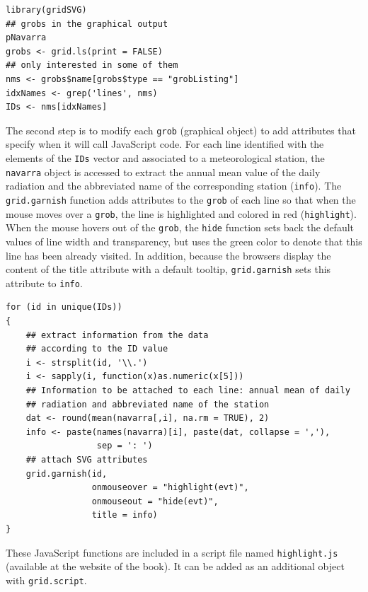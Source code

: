 \documentclass[smallroyalvopaper]{memoir}
\begin{document}
\lstset{language=r,label= ,caption= ,captionpos=b,numbers=none}
\begin{lstlisting}
library(gridSVG)
## grobs in the graphical output
pNavarra
grobs <- grid.ls(print = FALSE)
## only interested in some of them
nms <- grobs$name[grobs$type == "grobListing"]
idxNames <- grep('lines', nms)
IDs <- nms[idxNames]
\end{lstlisting}

The second step is to modify each \texttt{grob} (graphical object) to add
attributes that specify when it will call JavaScript code. For each
line identified with the elements of the \texttt{IDs} vector and associated
to a meteorological station, the \texttt{navarra} object is accessed to
extract the annual mean value of the daily radiation and the
abbreviated name of the corresponding station (\texttt{info}).  The
\texttt{grid.garnish} function adds attributes to the \texttt{grob} of each line so
that when the mouse moves over a \texttt{grob}, the line is highlighted and
colored in red (\texttt{highlight}). When the mouse hovers out of the \texttt{grob},
the \texttt{hide} function sets back the default values of line width and
transparency, but uses the green color to denote that this line has
been already visited. In addition, because the browsers display the
content of the title attribute with a default tooltip, \texttt{grid.garnish}
sets this attribute to \texttt{info}.


\lstset{language=r,label= ,caption= ,captionpos=b,numbers=none}
\begin{lstlisting}
for (id in unique(IDs))
{
    ## extract information from the data
    ## according to the ID value
    i <- strsplit(id, '\\.')
    i <- sapply(i, function(x)as.numeric(x[5]))
    ## Information to be attached to each line: annual mean of daily
    ## radiation and abbreviated name of the station
    dat <- round(mean(navarra[,i], na.rm = TRUE), 2)
    info <- paste(names(navarra)[i], paste(dat, collapse = ','),
                  sep = ': ')
    ## attach SVG attributes
    grid.garnish(id,
                 onmouseover = "highlight(evt)",
                 onmouseout = "hide(evt)",
                 title = info)
}
\end{lstlisting}

These JavaScript functions are included in a script file named
\texttt{highlight.js} (available at the website of the book). It can be
added as an additional object with \texttt{grid.script}.
\end{document}
